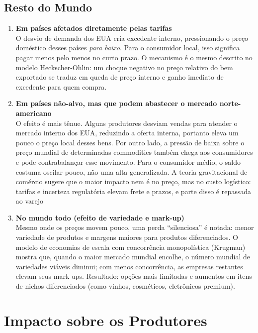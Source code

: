 \documentclass[a4paper,12pt]{article}[abntex2]
\begin{document}
\subsection*{\textbf{Resto do Mundo}}

\begin{enumerate}
    \item \textbf{Em países afetados diretamente pelas tarifas}\\
   O desvio de demanda dos EUA cria excedente interno, pressionando o preço doméstico desses países \emph{para baixo}.  
   Para o consumidor local, isso significa pagar menos pelo menos no curto prazo. O mecanismo é o mesmo descrito no modelo Heckscher-Ohlin: um choque negativo no preço relativo do bem exportado se traduz em queda de preço interno e ganho imediato de excedente para quem compra.

    \item \textbf{Em países não-alvo, mas que podem abastecer o mercado norte-americano}\\
    O efeito é mais tênue. Alguns produtores desviam vendas para atender o mercado interno dos EUA, reduzindo a oferta interna, portanto eleva um pouco o preço local desses bens. Por outro lado, a pressão de baixa sobre o preço mundial de determinadas commodities também chega aos consumidores e pode contrabalançar esse movimento. Para o consumidor médio, o saldo costuma oscilar pouco, não uma alta generalizada. A teoria gravitacional de comércio sugere que o maior impacto nem é no preço, mas no custo logístico: tarifas e incerteza regulatória elevam frete e prazos, e parte disso é repassada ao varejo

    \item \textbf{No mundo todo (efeito de variedade e mark-up)}\\
    Mesmo onde os preços movem pouco, uma perda “silenciosa” é notada: menor variedade de produtos e margens maiores para produtos diferenciados. O modelo de economias de escala com concorrência monopolística (Krugman) mostra que, quando o maior mercado mundial encolhe, o número mundial de variedades viáveis diminui; com menos concorrência, as empresas restantes elevam seus mark-ups. Resultado: opções mais limitadas e aumentos em itens de nichos diferenciados (como vinhos, cosméticos, eletrônicos premium).
\end{enumerate}


\section*{\textbf{Impacto sobre os Produtores}}
\end{document}
